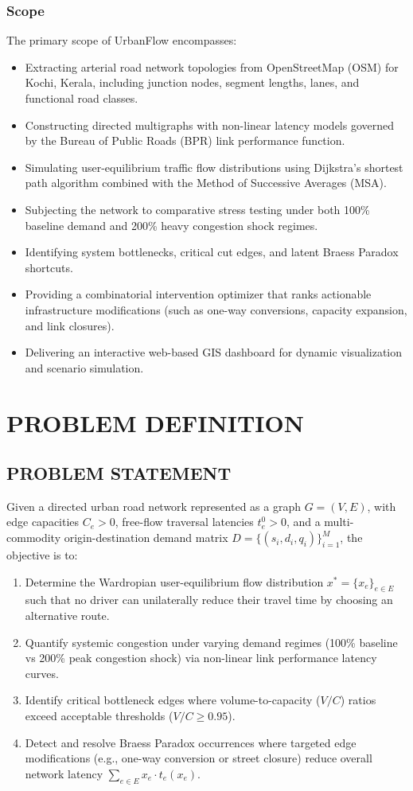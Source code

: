 \documentclass[12pt,a4paper]{report}
\begin{document}
\subsection*{Scope}
The primary scope of UrbanFlow encompasses:
\begin{itemize}
  \item Extracting arterial road network topologies from OpenStreetMap (OSM) for Kochi, Kerala, including junction nodes, segment lengths, lanes, and functional road classes.
  \item Constructing directed multigraphs with non-linear latency models governed by the Bureau of Public Roads (BPR) link performance function.
  \item Simulating user-equilibrium traffic flow distributions using Dijkstra's shortest path algorithm combined with the Method of Successive Averages (MSA).
  \item Subjecting the network to comparative stress testing under both 100\% baseline demand and 200\% heavy congestion shock regimes.
  \item Identifying system bottlenecks, critical cut edges, and latent Braess Paradox shortcuts.
  \item Providing a combinatorial intervention optimizer that ranks actionable infrastructure modifications (such as one-way conversions, capacity expansion, and link closures).
  \item Delivering an interactive web-based GIS dashboard for dynamic visualization and scenario simulation.
\end{itemize}

\chapter{PROBLEM DEFINITION}
\label{chap:problem}

\section{PROBLEM STATEMENT}
Given a directed urban road network represented as a graph $G = (V, E)$, with edge capacities $C_e > 0$, free-flow traversal latencies $t_e^0 > 0$, and a multi-commodity origin-destination demand matrix $D = \{(s_i, d_i, q_i)\}_{i=1}^M$, the objective is to:
\begin{enumerate}
  \item Determine the Wardropian user-equilibrium flow distribution $x^* = \{x_e\}_{e \in E}$ such that no driver can unilaterally reduce their travel time by choosing an alternative route.
  \item Quantify systemic congestion under varying demand regimes (100\% baseline vs 200\% peak congestion shock) via non-linear link performance latency curves.
  \item Identify critical bottleneck edges where volume-to-capacity ($V/C$) ratios exceed acceptable thresholds ($V/C \ge 0.95$).
  \item Detect and resolve Braess Paradox occurrences where targeted edge modifications (e.g., one-way conversion or street closure) reduce overall network latency $\sum_{e \in E} x_e \cdot t_e(x_e)$.
\end{enumerate}
\end{document}
